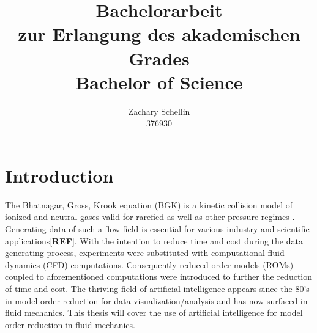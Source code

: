 \documentclass[12pt, a4paper]{article}
\begin{document}
\title{Bachelorarbeit\\ zur Erlangung des akademischen Grades\\ Bachelor of Science}
\author{Zachary Schellin\\376930}

\maketitle
\newpage
\tableofcontents
\newpage
\section{Introduction}
The Bhatnagar, Gross, Krook equation (BGK) is a kinetic collision model of ionized and neutral gases valid for rarefied as well as other pressure regimes \cite{BGK}. Generating data of such a flow field is essential for various industry and scientific applications[\textbf{REF}]. With the intention to reduce time and cost during the data generating process, experiments were substituted with computational fluid dynamics (CFD) computations. Consequently reduced-order models (ROMs) coupled to aforementioned computations were introduced to further the reduction of time and cost. The thriving field of artificial intelligence appears since the 80's in model order reduction for data visualization/analysis and has now surfaced in fluid mechanics. This thesis will cover the use of artificial intelligence for model order reduction in fluid mechanics.
\end{document}
